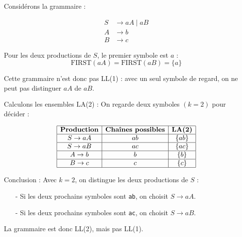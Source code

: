 \begin{example}
    Considérons la grammaire :
        
        \[
            \begin{aligned}
                S &\to aA \mid aB \\
                A &\to b \\
                B &\to c
            \end{aligned}
        \]

    Pour les deux productions de $S$, le premier symbole est $a$ :
        \[
            \text{FIRST}(aA) = \text{FIRST}(aB) = \{a\}
        \]

    Cette grammaire n'est donc {pas LL(1)} : avec un seul symbole de regard, on ne peut pas distinguer $aA$ de $aB$.

    {Calculons les ensembles LA(2)} : On regarde deux symboles $(k=2)$ pour décider :

        \[
            \begin{array}{|c|c|c|}
                \hline
                \textbf{Production} & \textbf{Chaînes possibles} & \textbf{LA(2)} \\
                \hline
                S \to aA & ab & \{ab\} \\
                \hline
                S \to aB & ac & \{ac\} \\
                \hline
                A \to b & b & \{b\} \\
                \hline
                B \to c & c & \{c\} \\
                \hline
            \end{array}
        \]

    {Conclusion :} Avec $k=2$, on distingue les deux productions de $S$ :
    \begin{itemize}
        \item[-] Si les deux prochains symboles sont \texttt{ab}, on choisit $S \to aA$.
        \item[-] Si les deux prochains symboles sont \texttt{ac}, on choisit $S \to aB$.
    \end{itemize}
    
    La grammaire est donc {LL(2)}, mais pas LL(1).
\end{example}

